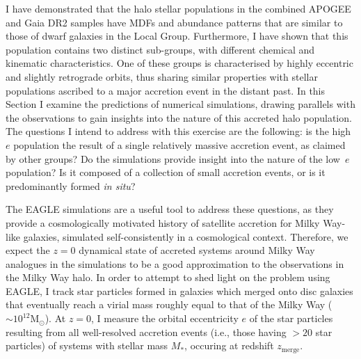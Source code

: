 I have demonstrated that the halo stellar populations in the
combined APOGEE and Gaia DR2 samples have MDFs and abundance
patterns that are similar to those of dwarf galaxies in the Local
Group. Furthermore, I have shown that this population contains
two distinct sub-groups, with different chemical and kinematic
characteristics. One of these groups is characterised by highly
eccentric and slightly retrograde orbits, thus sharing similar
properties with stellar populations ascribed to a major accretion
event in the distant past.  In this Section I examine the predictions
of numerical simulations, drawing parallels with the observations
to gain insights into the nature of this accreted halo
population.  The questions I intend to address with this exercise
are the following: is the high~$e$ population the result of a single
relatively massive accretion event, as claimed by other groups?  Do
the simulations provide insight into the nature of the low~$e$
population? Is it composed of a collection of small accretion events,
or is it predominantly formed {\it in situ}? 

The EAGLE simulations are a useful tool to address these questions,
as they provide a  cosmologically motivated history of satellite
accretion for Milky Way-like galaxies, simulated self-consistently
in a cosmological context.  Therefore,  we expect the  $z=0$ dynamical
state of accreted systems around Milky Way analogues in the simulations
to be a good approximation to the observations in the Milky Way
halo. In order to attempt to shed light on the problem using EAGLE, I track star particles formed in galaxies which merged onto disc galaxies that eventually reach a
virial mass roughly equal to that of the Milky Way ($\sim 10^{12}
\mathrm{M_{\odot}}$). At $z=0$, I measure the orbital eccentricity
$e$ of the star particles resulting from all well-resolved accretion
events (i.e., those having $>20$ star particles) of 
systems with stellar mass $M_*$, occuring at redshift $z_\mathrm{merge}$.

